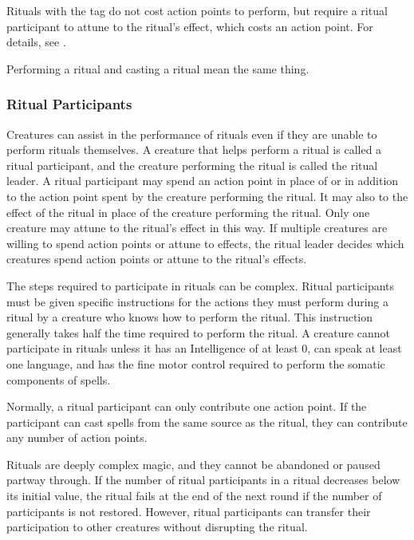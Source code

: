
        Rituals with the  tag do not cost action points to perform, but require a ritual participant to attune to the ritual's effect, which costs an action point.
        For details, see .

        Performing a ritual and casting a ritual mean the same thing.

        \subsubsection{Ritual Participants}
            Creatures can assist in the performance of rituals even if they are unable to perform rituals themselves.
            A creature that helps perform a ritual is called a ritual participant, and the creature performing the ritual is called the ritual leader.
            A ritual participant may spend an action point in place of or in addition to the action point spent by the creature performing the ritual.
            It may also  to the effect of the ritual in place of the creature performing the ritual.
            Only one creature may attune to the ritual's effect in this way.
            If multiple creatures are willing to spend action points or attune to effects, the ritual leader decides which creatures spend action points or attune to the ritual's effects.

            The steps required to participate in rituals can be complex.
            Ritual participants must be given specific instructions for the actions they must perform during a ritual by a creature who knows how to perform the ritual.
            This instruction generally takes half the time required to perform the ritual.
            A creature cannot participate in rituals unless it has an Intelligence of at least 0, can speak at least one language, and has the fine motor control required to perform the somatic components of spells.

            Normally, a ritual participant can only contribute one action point.
            If the participant can cast spells from the same source as the ritual, they can contribute any number of action points.

            Rituals are deeply complex magic, and they cannot be abandoned or paused partway through.
            If the number of ritual participants in a ritual decreases below its initial value, the ritual fails at the end of the next round if the number of participants is not restored.
            However, ritual participants can transfer their participation to other creatures without disrupting the ritual.

